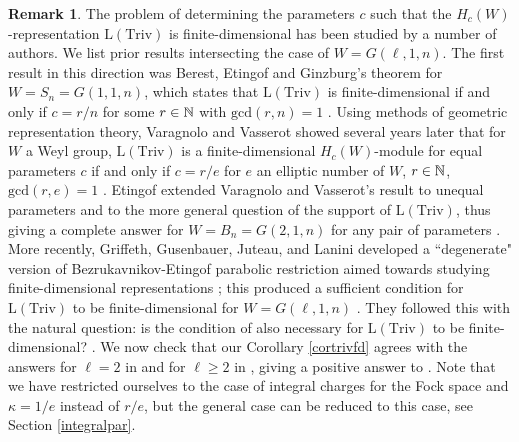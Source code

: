 \documentclass[12pt]{amsart}
\numberwithin{equation}{section}
\theoremstyle{definition}
\newtheorem{remark}[equation]{Remark}
\newcommand{\el}{\mathrm{L}}
\newcommand{\triv}{\mathrm{Triv}}
\begin{document}
\begin{remark}\label{remcompotherresults}
The problem of determining the parameters $c$ such that the $H_c(W)$-representation $\el(\triv)$ is finite-dimensional has been studied by a number of authors. We list prior results intersecting the case of $W=G(\ell,1,n)$. The first result in this direction was Berest, Etingof and Ginzburg's theorem for $W=S_n=G(1,1,n)$, which states that $\el(\triv)$ is finite-dimensional if and only if $c=r/n$ for some $r\in\mathbb{N}$ with $\mathrm{gcd}(r,n)=1$ \cite{BEG}. Using methods of geometric representation theory, Varagnolo and Vasserot showed several years later that for $W$ a Weyl group, $\el(\triv)$ is a finite-dimensional $H_c(W)$-module for equal parameters $c$ if and only if $c=r/e$ for $e$ an elliptic number of $W$, $r\in\mathbb{N}$, $\mathrm{gcd}(r,e)=1$ \cite{VV}. Etingof extended Varagnolo and Vasserot's result to unequal parameters and to the more general question of the support of $\el(\triv)$, thus giving a complete answer for $W=B_n=G(2,1,n)$ for any pair of parameters \cite{Etingof2012}. More recently, Griffeth, Gusenbauer, Juteau, and Lanini 
developed a ``degenerate" version of Bezrukavnikov-Etingof parabolic restriction aimed towards studying finite-dimensional representations \cite{GGJL}; this produced a sufficient condition for $\el(\triv)$ to be finite-dimensional for  $W=G(\ell,1,n)$ \cite[Corollary 5.4]{GGJL}. They followed this with the natural question: is the condition of \cite[Corollary 5.4]{GGJL} also necessary for $\el(\triv)$ to be finite-dimensional? \cite[Question 5.5]{GGJL}. 
We now check that our Corollary \ref{cortrivfd} agrees with the answers for $\ell=2$ in \cite{Etingof2012} and for $\ell\geq 2$ in \cite{GGJL}, giving a positive answer to \cite[Question 5.5]{GGJL}. Note that we have restricted ourselves to the case of integral charges for the Fock space and $\kappa=1/e$ instead of $r/e$, but the general case can be reduced to this case, see Section \ref{integralpar}.


\end{remark}
\end{document}
